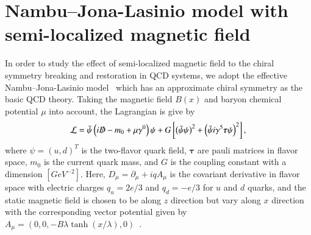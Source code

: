 \documentclass[aps,prd,amsmath,two column,amssymb,showpacs]{revtex4}
\begin{document}
\section{Nambu--Jona-Lasinio model with semi-localized magnetic field}\label{NJL}
In order to study the effect of semi-localized magnetic field to the chiral symmetry breaking and restoration in QCD systems, we adopt the effective Nambu--Jona-Lasinio model~\cite{Nambu:1961tp,Nambu:1961fr,Klevansky:1992qe} which has an approximate chiral symmetry as the basic QCD theory. Taking the magnetic field $B(x)$ and baryon chemical potential $\mu$ into account, the Lagrangian is give by
\begin{eqnarray}
{\cal L}=\bar\psi\left(i\slashed{D}-m_0+{\mu}\gamma^0\right)\psi
+{G}\left[\left(\bar\psi\psi\right)^2+\left(\bar\psi i\gamma^5{\boldsymbol \tau}\psi\right)^2\right],
\end{eqnarray}
where $\psi=\left(u,d\right)^T$ is the two-flavor quark field, ${\boldsymbol \tau}$ are pauli matrices in flavor space, $m_0$ is the current quark mass, and $G$ is the coupling constant with a dimension $[GeV^{-2}]$. Here, $D_\mu=\partial_\mu+iq A_\mu$ is the covariant derivative in flavor space with electric charges $q_u=2e/3$ and $q_d=-e/3$ for $u$ and $d$ quarks, and the static magnetic field is chosen to be along $z$ direction but vary along $x$ direction with the corresponding vector potential given by $A_\mu=(0,0,-B\lambda\tanh(x/\lambda),0)$~\cite{Cangemi:1995ee}. 
\end{document}
